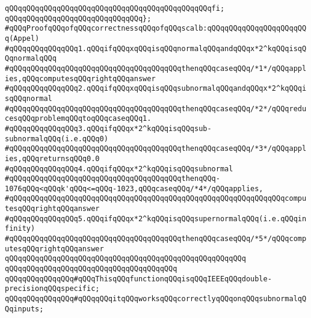 \verb|qQQqqQQqqQQqqQQqqQQqqQQqqQQqqQQqqQQqqQQqqQQqqQQqfi;|\newline
\verb|qQQqqQQqqQQqqQQqqQQqqQQqqQQqqQQq};|\newline
\newline
\verb|#qQQqProofqQQqofqQQqcorrectnessqQQqofqQQqscalb:qQQqqQQqqQQqqQQqqQQqqQQq(Appel)|\newline
\verb|#qQQqqQQqqQQqqQQq1.qQQqifqQQqxqQQqisqQQqnormalqQQqandqQQqx*2^kqQQqisqQQqnormalqQQq|\newline
\verb|#qQQqqQQqqQQqqQQqqQQqqQQqqQQqqQQqqQQqqQQqthenqQQqcaseqQQq/*1*/qQQqapplies,qQQqcomputesqQQqrightqQQqanswer|\newline
\verb|#qQQqqQQqqQQqqQQq2.qQQqifqQQqxqQQqisqQQqsubnormalqQQqandqQQqx*2^kqQQqisqQQqnormal|\newline
\verb|#qQQqqQQqqQQqqQQqqQQqqQQqqQQqqQQqqQQqqQQqthenqQQqcaseqQQq/*2*/qQQqreducesqQQqproblemqQQqtoqQQqcaseqQQq1.|\newline
\verb|#qQQqqQQqqQQqqQQq3.qQQqifqQQqx*2^kqQQqisqQQqsub-subnormalqQQq(i.e.qQQq0)|\newline
\verb|#qQQqqQQqqQQqqQQqqQQqqQQqqQQqqQQqqQQqqQQqthenqQQqcaseqQQq/*3*/qQQqapplies,qQQqreturnsqQQq0.0|\newline
\verb|#qQQqqQQqqQQqqQQq4.qQQqifqQQqx*2^kqQQqisqQQqsubnormal|\newline
\verb|#qQQqqQQqqQQqqQQqqQQqqQQqqQQqqQQqqQQqqQQqthenqQQq-1076qQQq<qQQqk'qQQq<=qQQq-1023,qQQqcaseqQQq/*4*/qQQqapplies,|\newline
\verb|#qQQqqQQqqQQqqQQqqQQqqQQqqQQqqQQqqQQqqQQqqQQqqQQqqQQqqQQqqQQqqQQqcomputesqQQqrightqQQqanswer|\newline
\verb|#qQQqqQQqqQQqqQQq5.qQQqifqQQqx*2^kqQQqisqQQqsupernormalqQQq(i.e.qQQqinfinity)|\newline
\verb|#qQQqqQQqqQQqqQQqqQQqqQQqqQQqqQQqqQQqqQQqthenqQQqcaseqQQq/*5*/qQQqcomputesqQQqrightqQQqanswer|\newline
\newline
\verb|qQQqqQQqqQQqqQQqqQQqqQQqqQQqqQQqqQQqqQQqqQQqqQQqqQQqqQQq|\newline
\verb|qQQqqQQqqQQqqQQqqQQqqQQqqQQqqQQqqQQqqQQq|\newline
\newline
\newline
\newline
\verb|qQQqqQQqqQQqqQQq#qQQqThisqQQqfunctionqQQqisqQQqIEEEqQQqdouble-precisionqQQqspecific;|\newline
\verb|qQQqqQQqqQQqqQQq#qQQqqQQqitqQQqworksqQQqcorrectlyqQQqonqQQqsubnormalqQQqinputs;|\newline
